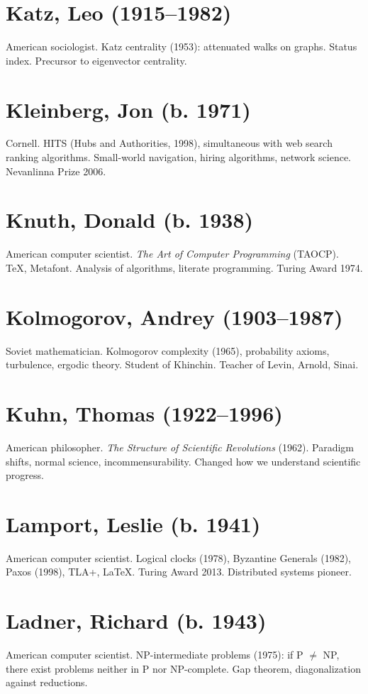\section*{Katz, Leo (1915--1982)}
American sociologist. Katz centrality (1953): attenuated walks on graphs. Status index. Precursor to eigenvector centrality.

\section*{Kleinberg, Jon (b. 1971)}
Cornell. HITS (Hubs and Authorities, 1998), simultaneous with web search ranking algorithms. Small-world navigation, hiring algorithms, network science. Nevanlinna Prize 2006.

\section*{Knuth, Donald (b. 1938)}
American computer scientist. \emph{The Art of Computer Programming} (TAOCP). TeX, Metafont. Analysis of algorithms, literate programming. Turing Award 1974.

\section*{Kolmogorov, Andrey (1903--1987)}
Soviet mathematician. Kolmogorov complexity (1965), probability axioms, turbulence, ergodic theory. Student of Khinchin. Teacher of Levin, Arnold, Sinai.

\section*{Kuhn, Thomas (1922--1996)}
American philosopher. \emph{The Structure of Scientific Revolutions} (1962). Paradigm shifts, normal science, incommensurability. Changed how we understand scientific progress.

\section*{Lamport, Leslie (b. 1941)}
American computer scientist. Logical clocks (1978), Byzantine Generals (1982), Paxos (1998), TLA+, LaTeX. Turing Award 2013. Distributed systems pioneer.

\section*{Ladner, Richard (b. 1943)}
American computer scientist. NP-intermediate problems (1975): if P $\neq$ NP, there exist problems neither in P nor NP-complete. Gap theorem, diagonalization against reductions.

